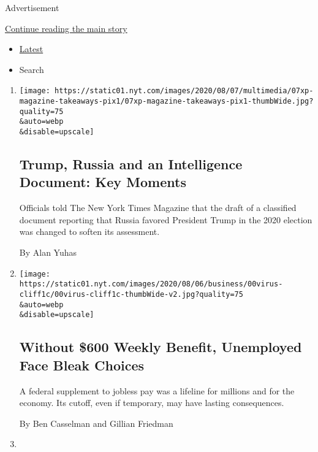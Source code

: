 Advertisement

\protect\hyperlink{after-mid1}{Continue reading the main story}

\begin{itemize}
\tightlist
\item
  \protect\hyperlink{stream-panel}{Latest}
\item
  Search
\end{itemize}

\begin{enumerate}
\def\labelenumi{\arabic{enumi}.}
\item
  \href{/2020/08/08/us/politics/trump-russia.html}{}

  \texttt{[image: https://static01.nyt.com/images/2020/08/07/multimedia/07xp-magazine-takeaways-pix1/07xp-magazine-takeaways-pix1-thumbWide.jpg?quality=75\\\&auto=webp\\\&disable=upscale]}

  \hypertarget{trump-russia-and-an-intelligence-document-key-moments-1}{%
  \subsection{Trump, Russia and an Intelligence Document: Key
  Moments}\label{trump-russia-and-an-intelligence-document-key-moments-1}}

  Officials told The New York Times Magazine that the draft of a
  classified document reporting that Russia favored President Trump in
  the 2020 election was changed to soften its assessment.

  By Alan Yuhas
\item
  \href{/2020/08/08/business/economy/lost-unemployment-benefits.html}{}

  \texttt{[image: https://static01.nyt.com/images/2020/08/06/business/00virus-cliff1c/00virus-cliff1c-thumbWide-v2.jpg?quality=75\\\&auto=webp\\\&disable=upscale]}

  \hypertarget{without-600-weekly-benefit-unemployed-face-bleak-choices}{%
  \subsection{Without \$600 Weekly Benefit, Unemployed Face Bleak
  Choices}\label{without-600-weekly-benefit-unemployed-face-bleak-choices}}

  A federal supplement to jobless pay was a lifeline for millions and
  for the economy. Its cutoff, even if temporary, may have lasting
  consequences.

  By Ben Casselman and Gillian Friedman
\item
  \href{/2020/08/08/style/katie-hill-she-will-rise-revenge-porn.html}{}


\end{enumerate}
